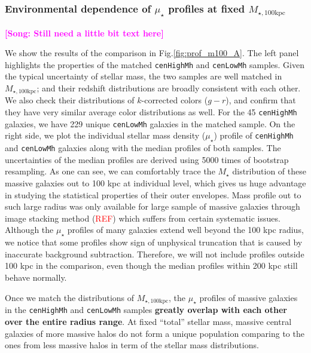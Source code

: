 \documentclass{emulateapj}
\def\rbcg{\texttt{cenHighMh}}
\def\nbcg{\texttt{cenLowMh}}
\def\mstar{{$M_{\star}$}}
\def\mtot{{$M_{\star,100\mathrm{kpc}}$}}
\def\mden{{$\mu_{\star}$}}
\newcommand{\addref}{{\textcolor{red}{REF}}}
\newcommand{\song}[1]{\textcolor{magenta}{\textbf{[Song: #1]}}}
\begin{document}
\begin{CJK*}{UTF8}{gbsn}

\subsubsection{Environmental dependence of \mden{} profiles at fixed \mtot{}}
    \label{sssec:sbp_mtot}

    \song{Still need a little bit text here}

    We show the results of the comparison in Fig.\ref{fig:prof_m100_A}. 
    The left panel highlights the properties of the matched \rbcg{} and \nbcg{} 
    samples.
    Given the typical uncertainty of stellar mass, the two samples are well 
    matched in \mtot{}; and their redshift distributions are broadly 
    consistent with each other.  
    We also check their distributions of $k$-corrected colors ($g-r$), and confirm 
    that they have very similar average color distributions as well.  
    For the 45 \rbcg{} galaxies, we have 229 unique \nbcg{} galaxies in the 
    matched sample.
    On the right side, we plot the individual stellar mass density (\mden{}) profile 
    of \rbcg{} and \nbcg{} galaxies along with the median profiles of both samples. 
    The uncertainties of the median profiles are derived using 5000 times of 
    bootstrap resampling.
    As one can see, we can comfortably trace the \mstar{} distribution of these massive 
    galaxies out to 100 kpc at individual level, which gives us huge advantage in 
    studying the statistical properties of their outer envelopes. 
    Mass profile out to such large radius was only available for large sample of 
    massive galaxies through image stacking method (\addref) which suffers from certain
    systematic issues. 
    Although the \mden{} profiles of many galaxies extend well beyond the 100 kpc radius, 
    we notice that some profiles show sign of unphysical truncation that is caused 
    by inaccurate background subtraction.  
    Therefore, we will not include profiles outside 100 kpc in the comparison, even 
    though the median profiles within 200 kpc still behave normally.  
        
    Once we match the distributions of \mtot{}, the \mden{} profiles of massive 
    galaxies in the \rbcg{} and \nbcg{} samples \textbf{greatly overlap with each 
    other over the entire radius range}. 
    At fixed ``total'' stellar mass, massive central galaxies of more massive 
    halos do not form a unique population comparing to the ones from less massive 
    halos in term of the stellar mass distributions. 
    

\end{CJK*}
\end{document}
